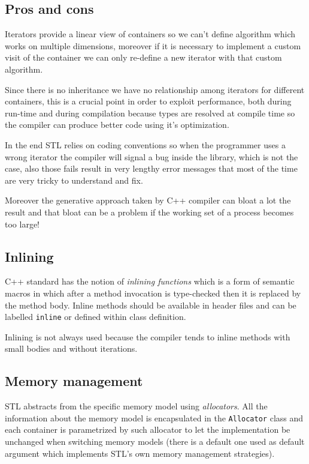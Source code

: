 \subsection{Pros and cons}
Iterators provide a linear view of containers so we can't define algorithm which works on multiple dimensions, moreover if it is necessary to implement a custom visit of the container we can only re-define a new iterator with that custom algorithm.

Since there is no inheritance we have no relationship among iterators for different containers, this is a crucial point in order to exploit performance, both during run-time and during compilation because types are resolved at compile time so the compiler can produce better code using it's optimization.

In the end STL relies on coding conventions so when the programmer uses a wrong iterator the compiler will signal a bug inside the library, which is not the case, also those fails result in very lengthy error messages that most of the time are very tricky to understand and fix.

Moreover the generative approach taken by C++ compiler can bloat a lot the result and that bloat can be a problem if the working set of a process becomes too large!

\subsection{Inlining}
C++ standard has the notion of \emph{inlining functions} which is a form of semantic macros in which after a method invocation is type-checked then it is replaced by the method body.
Inline methods should be available in header files and can be labelled \verb|inline| or defined within class definition.

Inlining is not always used because the compiler tends to inline methods with small bodies and without iterations.

\subsection{Memory management}
STL abstracts from the specific memory model using \emph{allocators}.
All the information about the memory model is encapsulated in the \verb|Allocator| class and each container is parametrized by such allocator to let the implementation be unchanged when switching memory models (there is a default one used as default argument which implements STL's own memory management strategies). 
